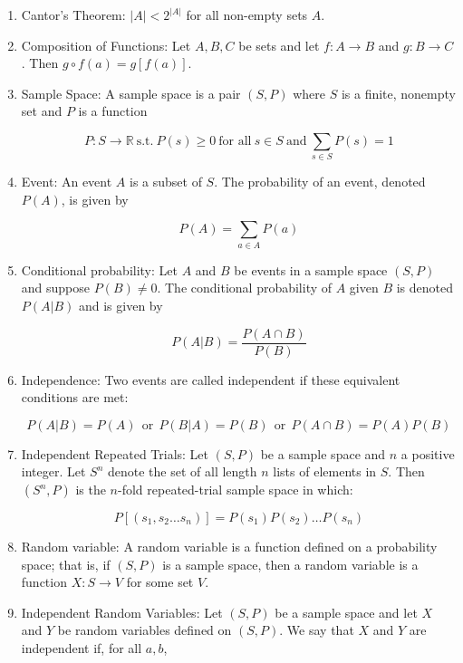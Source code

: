 \documentclass{article}
\begin{document}
\begin{enumerate}
		\item Cantor's Theorem: $|A|<2^{|A|}$ for all non-empty sets $A$.
		
		\item Composition of Functions: Let $A,B,C$ be sets and let $f:A\to B$ and $g:B\to C$.
		Then $g\circ f(a)=g[f(a)]$.
		
		\item Sample Space: A sample space is a pair $(S,P)$ where $S$ is a finite, nonempty set and $P$ is a function
		
		\[P:S\to\mathbb{R}\: \text{s.t.}\: P(s)\geq 0 \: \text{for all}\: s\in S \:\text{and}\: \sum_{s\in S}P(s)=1\]
		
		\item Event: An event $A$ is a subset of $S$.
		The probability of an event, denoted $P(A)$, is given by
		
		\[P(A)=\sum_{a\in A}P(a)\]
		
		\item Conditional probability: Let $A$ and $B$ be events in a sample space $(S,P)$ and suppose $P(B)\neq 0$.
		The conditional probability of $A$ given $B$ is denoted $P(A|B)$ and is given by
		
		\[P(A|B)=\frac{P(A\cap B)}{P(B)}\]
		
		\item Independence: Two events are called independent if these equivalent conditions are met:
		
		\[P(A|B)=P(A)\:\: \text{or} \:\: P(B|A)=P(B) \:\: \text{or} \:\: P(A\cap B)=P(A)P(B)\]
		
		\item Independent Repeated Trials: Let $(S,P)$ be a sample space and $n$ a positive integer.
		Let $S^n$ denote the set of all length $n$ lists of elements in $S$.
		Then $(S^n,P)$ is the $n$-fold repeated-trial sample space in which:
		
		\[P[(s_1,s_2 \dots s_n)] = P(s_1) P(s_2) \dots P(s_n)\]
		
		\item Random variable: A random variable is a function defined on a probability space;
		that is, if $(S,P)$ is a sample space, then a random variable is a function $X:S\to V$ for some set $V$.
		
		\item Independent Random Variables: Let $(S,P)$ be a sample space and let $X$ and $Y$ be random variables defined on $(S,P)$.
		We say that $X$ and $Y$ are independent if, for all $a,b$,
		

\end{enumerate}
\end{document}
